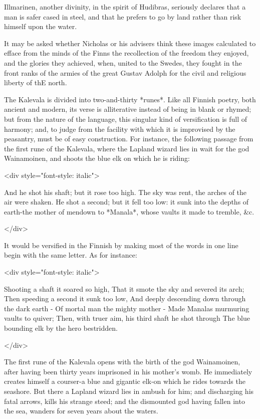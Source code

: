 \documentclass[10pt,a4paper]{article}
\begin{document}
Illmarinen, another divinity, in the spirit of Hudibras, seriously declares that a man is safer cased in steel, and that he prefers to go by land rather than risk himself upon the water.

It may be asked whether Nicholas or his advisers think these images calculated to efface from the minds of the Finns the recollection of the freedom they enjoyed, and the glories they achieved, when, united to the Swedes, they fought in the front ranks of the armies of the great Gustav Adolph for the civil and religious liberty of thE north.

The Kalevala is divided into two-and-thirty *runes*. Like all Finnish poetry, both ancient and modern, its verse is alliterative instead of being in blank or rhymed; but from the nature of the language, this singular kind of versification is full of harmony; and, to judge from the facility with which it is improvised by the peasantry, must be of easy construction. For instance, the following passage from the first rune of the Kalevala, where the Lapland wizard lies in wait for the god Wainamoinen, and shoots the blue elk on which he is riding:

<div style="font-style: italic">

And he shot his shaft; but it rose too high. The sky was rent, the arches of the air were shaken. He shot a second; but it fell too low: it sunk into the depths of earth-the mother of mendown to *Manala*, whose vaults it made to tremble, &c.

</div>

It would be versified in the Finnish by making most of the words in one line begin with the same letter. As for instance:

<div style="font-style: italic">

Shooting a shaft it soared so high,
That it smote the sky and severed its arch;
Then speeding a second it sunk too low,
And deeply descending down through the dark earth -
Of mortal man the mighty mother -
Made Manalas murmuring vaults to quiver;
Then, with truer aim, his third shaft he shot through 
The blue bounding elk by the hero bestridden.

</div>

The first rune of the Kalevala opens with the birth of the god Wainamoinen, after having been thirty years imprisoned in his mother's womb. He immediately creates himself a courser-a blue and gigantic elk-on which he rides towards the seashore. But there a Lapland wizard lies in ambush for him; and discharging his fatal arrows, kills his strange steed; and the dismounted god having fallen into the sea, wanders for seven years about the waters.
\end{document}
